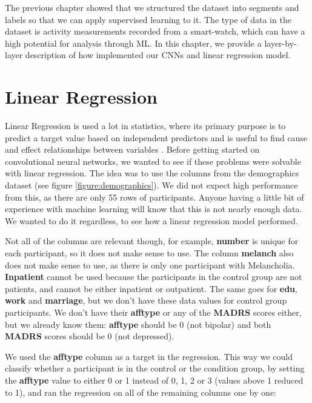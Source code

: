 The previous chapter showed that we structured the dataset into segments and labels so that we can apply supervised learning to it. The type of data in the dataset is activity measurements recorded from a smart-watch, which can have a high potential for analysis through ML. In this chapter, we provide a layer-by-layer description of how implemented our CNNs and linear regression model.

\section{Linear Regression}

Linear Regression is used a lot in statistics, where its primary purpose is to predict a target value based on independent predictors and is useful to find cause and effect relationships between variables \cite{linear_regression}. Before getting started on convolutional neural networks, we wanted to see if these problems were solvable with linear regression. The idea was to use the columns from the demographics dataset (see figure \ref{figure:demographics}). We did not expect high performance from this, as there are only 55 rows of participants. Anyone having a little bit of experience with machine learning will know that this is not nearly enough data. We wanted to do it regardless, to see how a linear regression model performed.

Not all of the columns are relevant though, for example, \textbf{number} is unique for each participant, so it does not make sense to use. The column \textbf{melanch} also does not make sense to use, as there is only one participant with Melancholia. \textbf{Inpatient} cannot be used because the participants in the control group are not patients, and cannot be either inpatient or outpatient. The same goes for \textbf{edu}, \textbf{work} and \textbf{marriage}, but we don't have these data values for control group participants. We don't have their \textbf{afftype} or any of the \textbf{MADRS} scores either, but we already know them: \textbf{afftype} should be 0 (not bipolar) and both \textbf{MADRS} scores should be 0 (not depressed). 

We used the \textbf{afftype} column as a target in the regression. This way we could classify whether a participant is in the control or the condition group, by setting the \textbf{afftype} value to either 0 or 1 instead of 0, 1, 2 or 3 (values above 1 reduced to 1), and ran the regression on all of the remaining columns one by one:

